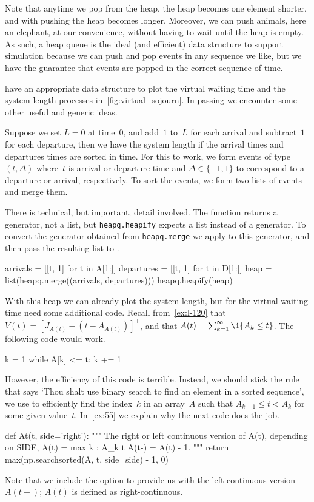 \documentclass[queueing-book.tex]{subfiles}
\begin{document}
Note that anytime we pop from the heap, the heap becomes one element shorter, and with pushing the heap becomes longer.
Moreover, we can push animals, here an elephant, at our convenience, without having to wait until the heap is empty.
As such, a heap queue is the ideal (and efficient) data structure to support simulation because we can push and pop events in any sequence we like, but we have the guarantee that events are popped in the correct sequence of time.

 have an appropriate data structure to plot the virtual waiting time and the system length processes in~\cref{fig:virtual_sojourn}.
In passing we encounter some other useful and generic ideas.

Suppose we set $L=0$ at time~$0$, and add~$1$ to~$L$ for each arrival and subtract~$1$ for each departure, then we have the system length if the arrival times and departures times are sorted in time.
For this to work, we form events of type $(t, \Delta)$ where~$t$ is arrival or departure time and $\Delta \in \{-1, 1\}$ to correspond to a departure or arrival, respectively.
To sort the events, we form two lists of events and merge them.

There is technical, but important, detail involved.
The function  returns a generator, not a list, but \texttt{heapq.heapify} expects a list instead of a generator.
To convert the generator obtained from \texttt{heapq.merge} we apply  to this generator, and then pass the resulting list to .
\begin{python}
arrivals = [[t, 1] for t in A[1:]]
departures = [[t, 1] for t in D[1:]]
heap = list(heapq.merge((arrivals, departures)))
heapq.heapify(heap)
\end{python}

With this heap we can already plot the system length, but for the virtual waiting time need some additional code.
Recall from~\cref{ex:l-120} that $V(t) = [J_{A(t)} - (t-A_{A(t)})]^{+}$, and that $A(t) = \sum_{k=1}^{\infty} \1{A_k\leq t}$. The following code would work.
\begin{python}
k = 1
while A[k] <= t:
    k += 1
\end{python}
However, the efficiency of this code is terrible.
Instead, we should stick the rule that says `Thou shalt use binary search to find an element in a sorted sequence', we use  to efficiently find the index~$k$ in an array~$A$ such that $A_{k-1} \leq t < A_{k}$ for some given value~$t$.
In~\cref{ex:55} we explain why the next code does the job.
\begin{python}
def At(t, side='right'):
    """
    The right or left continuous version of A(t), depending on SIDE,
    A(t) = max {k : A_k \geq t}
    A(t-) = A(t) - 1.
    """
    return max(np.searchsorted(A, t, side=side) - 1, 0)
\end{python}
Note that we include the option  to provide us with the left-continuous version $A(t-)$; $A(t)$ is defined as right-continuous.
\end{document}
